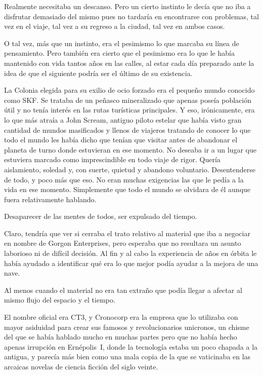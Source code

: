 Realmente necesitaba un descanso. Pero un cierto instinto le decía que no iba a disfrutar demasiado del mismo pues no tardaría en encontrarse con problemas, tal vez en el viaje, tal vez a su regreso a la ciudad, tal vez en ambos casos.

O tal vez, más que un instinto, era el pesimismo lo que marcaba su línea de pensamiento. Pero también era cierto que el pesimismo era lo que le había mantenido con vida tantos años en las calles, al estar cada día preparado ante la idea de que el siguiente podría ser el último de su existencia.

La Colonia elegida para su exilio de ocio forzado era el pequeño mundo conocido como SKF. Se trataba de un peñasco mineralizado que apenas poseía población útil y no tenía interés en las rutas turísticas principales. Y eso, irónicamente, era lo que más atraía a John Scream, antiguo piloto estelar que había visto gran cantidad de mundos masificados y llenos de viajeros tratando de conocer lo que todo el mundo les había dicho que tenían que visitar antes de abandonar el planeta de turno donde estuvieran en ese momento. No deseaba ir a un lugar que estuviera marcado como imprescindible en todo viaje de rigor. Quería aislamiento, soledad y, con suerte, quietud y abandono voluntario. Desentenderse de todo, y poco más que eso. No eran muchas exigencias las que le pedía a la vida en ese momento. Simplemente que todo el mundo se olvidara de él aunque fuera relativamente hablando.

Desaparecer de las mentes de todos, ser expulsado del tiempo.

Claro, tendría que ver si cerraba el trato relativo al material que iba a negociar en nombre de Gorgon Enterprises, pero esperaba que no resultara un asunto laborioso ni de difícil decisión. Al fin y al cabo la experiencia de años en órbita le había ayudado a identificar qué era lo que mejor podía ayudar a la mejora de una nave.

Al menos cuando el material no era tan extraño que podía llegar a afectar al mismo flujo del espacio y el tiempo.

El nombre oficial era CT3, y Cronocorp era la empresa que lo utilizaba con mayor asiduidad para crear sus famosos y revolucionarios unicronos, un chisme del que se había hablado mucho en muchas partes pero que no había hecho apenas irrupción en Ernépolis~I, donde la tecnología estaba un poco chapada a la antigua, y parecía más bien como una mala copia de la que se vaticinaba en las arcaicas novelas de ciencia ficción del siglo veinte.

